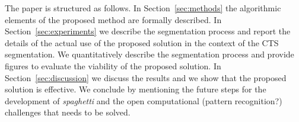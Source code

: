 The paper is structured as follows. In Section~\ref{sec:methods} the
algorithmic elements of the proposed method are formally described. In
Section~\ref{sec:experiments} we describe the segmentation process and
report the details of the actual use of the proposed solution in the
context of the CTS segmentation. We quantitatively describe the
segmentation process and provide figures to evaluate the viability of
the proposed solution. In Section~\ref{sec:discussion} we discuss the
results and we show that the proposed solution is effective. We
conclude by mentioning the future steps for the development of
\emph{spaghetti} and the open computational (pattern recognition?)
challenges that needs to be solved.

